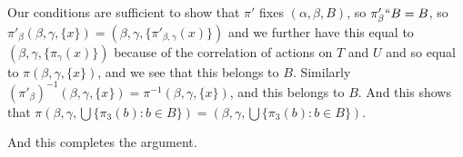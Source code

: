 \documentclass[12pt]{article}
\begin{document}
Our conditions are sufficient to show that $\pi'$ fixes $(\alpha,\beta,B)$, so $\pi'_\beta``B = B$, so $\pi'_\beta(\beta,\gamma,\{x\}) = (\beta,\gamma,\{\pi'_{\beta,\gamma}(x)\})$ and we further have this equal to  $(\beta,\gamma,\{\pi_{\gamma}(x)\})$ because of the correlation of actions on $T$ and $U$ and so equal to $\pi(\beta,\gamma,\{x\})$, and we see that this belongs to $B$.  Similarly 
$(\pi'_{\beta})^{-1}(\beta,\gamma,\{x\}) = \pi^{-1}(\beta,\gamma,\{x\})$, and this belongs to $B$.  And this shows that $\pi(\beta,\gamma,\bigcup\{\pi_3(b):b \in B\})=(\beta,\gamma,\bigcup\{\pi_3(b):b \in B\})$.


And this completes the argument.  
\end{document}
